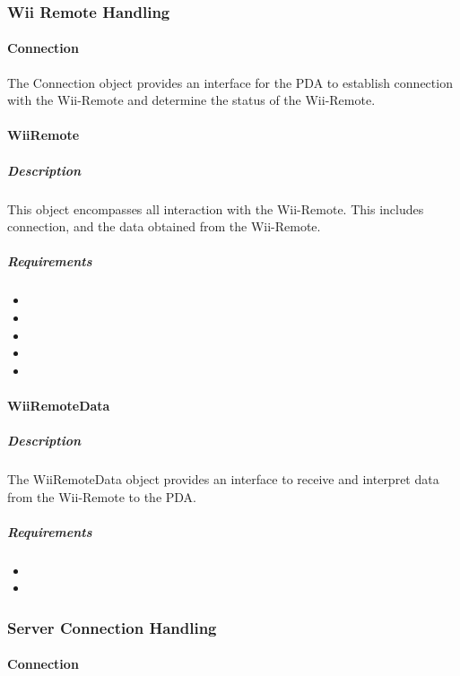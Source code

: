 \documentclass{article}
\begin{document}
\subsubsection{Wii Remote Handling}
\paragraph{Connection}
The Connection object provides an interface for the PDA to establish connection with the Wii-Remote and determine the status of the Wii-Remote.
\paragraph{WiiRemote}
\subparagraph{Description}
This object encompasses all interaction with the Wii-Remote. This includes connection, and the data obtained from the Wii-Remote. 
\subparagraph{Requirements}
\begin{itemize}
\item {}
\item {}
\item {}
\item {}
\item {}
\end{itemize}

\paragraph{WiiRemoteData}
\subparagraph{Description}
The WiiRemoteData object provides an interface to receive and interpret data from the Wii-Remote to the PDA.
\subparagraph{Requirements}
\begin{itemize}
\item {}
\item {}
\end{itemize}

\subsubsection{Server Connection Handling}
\paragraph{Connection}
\end{document}
